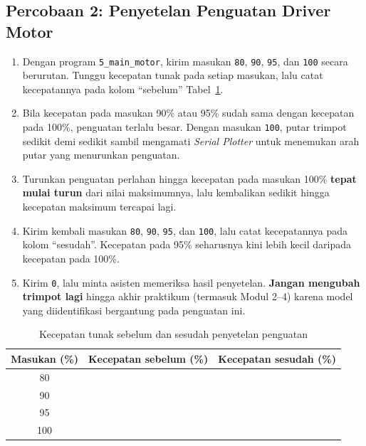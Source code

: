 \documentclass[11pt,a4paper]{article}
\newcommand{\prog}[1]{\texttt{#1}}
\begin{document}
\subsection{Percobaan 2: Penyetelan Penguatan Driver Motor}
\begin{enumerate}
	\item Dengan program \prog{5\_main\_motor}, kirim masukan \texttt{80}, \texttt{90}, \texttt{95}, dan \texttt{100} secara berurutan. Tunggu kecepatan tunak pada setiap masukan, lalu catat kecepatannya pada kolom ``sebelum'' Tabel~\ref{tab:p2_trimpot}.
	\item Bila kecepatan pada masukan 90\% atau 95\% sudah sama dengan kecepatan pada 100\%, penguatan terlalu besar. Dengan masukan \texttt{100}, putar trimpot sedikit demi sedikit sambil mengamati \textit{Serial Plotter} untuk menemukan arah putar yang menurunkan penguatan.
	\item Turunkan penguatan perlahan hingga kecepatan pada masukan 100\% \textbf{tepat mulai turun} dari nilai maksimumnya, lalu kembalikan sedikit hingga kecepatan maksimum tercapai lagi.
	\item Kirim kembali masukan \texttt{80}, \texttt{90}, \texttt{95}, dan \texttt{100}, lalu catat kecepatannya pada kolom ``sesudah''. Kecepatan pada 95\% seharusnya kini lebih kecil daripada kecepatan pada 100\%.
	\item Kirim \texttt{0}, lalu minta asisten memeriksa hasil penyetelan. \textbf{Jangan mengubah trimpot lagi} hingga akhir praktikum (termasuk Modul 2--4) karena model yang diidentifikasi bergantung pada penguatan ini.
\end{enumerate}

\begin{table}[H]
	\centering
	\caption{Kecepatan tunak sebelum dan sesudah penyetelan penguatan}
	\label{tab:p2_trimpot}
	\begin{tabular}{|c|c|c|}
		\hline
		\textbf{Masukan (\%)} & \textbf{Kecepatan sebelum (\%)} & \textbf{Kecepatan sesudah (\%)} \\
		\hline
		80                    &                                 &                                 \\
		90                    &                                 &                                 \\
		95                    &                                 &                                 \\
		100                   &                                 &                                 \\
		\hline
	\end{tabular}
\end{table}
\end{document}
